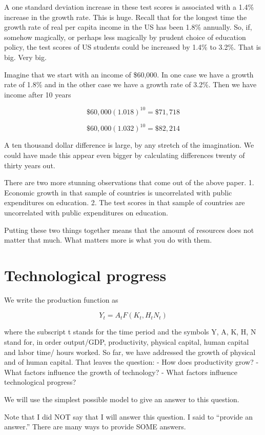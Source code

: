 \documentclass[
]{book}
\begin{document}
A one standard deviation increase in these test scores is associated with a 1.4\% increase in the growth rate. This is huge. Recall that for the longest time the growth rate of real per capita income in the US has been 1.8\% annually. So, if, somehow magically, or perhaps less magically by prudent choice of education policy, the test scores of US students could be increased by 1.4\% to 3.2\%. That is big. Very big.

Imagine that we start with an income of \$60,000. In one case we have a growth rate of 1.8\% and in the other case we have a growth rate of 3.2\%. Then we have income after 10 years

\[\$60,000 (1.018)^{10} = \$71,718 \]

\[\$60,000 (1.032)^{10} = \$82,214\]

A ten thousand dollar difference is large, by any stretch of the imagination. We could have made this appear even bigger by calculating differences twenty of thirty years out.

There are two more stunning observations that come out of the above paper.
1. Economic growth in that sample of countries is uncorrelated with public expenditures on education.
2. The test scores in that sample of countries are uncorrelated with public expenditures on education.

Putting these two things together means that the amount of resources does not matter that much. What matters more is what you do with them.

\hypertarget{technological-progress}{%
\section{Technological progress}\label{technological-progress}}

We write the production function as

\[Y_t  =  A_t F( K_t, H_tN_t)\]

where the subscript t stands for the time period and the symbols Y, A, K, H, N stand for, in order output/GDP, productivity, physical capital, human capital and labor time/ hours worked. So far, we have addressed the growth of physical and of human capital. That leaves the question:
- How does productivity grow?
- What factors influence the growth of technology?
- What factors influence technological progress?

We will use the simplest possible model to give an answer to this question.

Note that I did NOT say that I will answer this question. I said to ``provide an answer.'' There are many ways to provide SOME answers.
\end{document}
